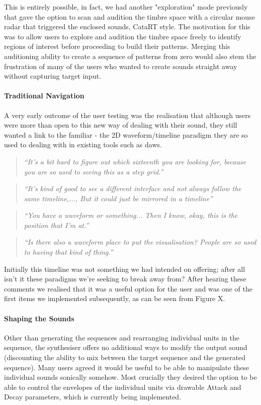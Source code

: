 This is entirely possible, in fact, we had another "exploration" mode previously that gave the option to scan and audition the timbre space with a circular mouse radar that triggered the enclosed sounds, CataRT style. The motivation for this was to allow users to explore and audition the timbre space freely to identify regions of interest before proceeding to build their patterns. Merging this auditioning ability to create a sequence of patterns from zero would  also stem the frustration of many of the users who wanted to create sounds straight away without capturing target input.

\paragraph{Traditional Navigation}

A very early outcome of the user testing was the realisation that although users were more than open to this new way of dealing with their sound, they still wanted a link to the familiar - the  2D waveform/timeline paradigm they are so used to dealing with in existing tools such as \acrshort{daw}s.

\blockquote{\textit{“It's a bit hard to figure out which sixteenth you are looking for, because you are so used to seeing this as a step grid.”}}

\blockquote{\textit{“It's kind of good to see a different interface and not always follow the same timeline,..., But it could just be mirrored in a timeline”}}

\blockquote{\textit{“You have a waveform or something...  Then I know, okay, this is the position that I'm at.”}}

\blockquote{\textit{“Is there also a  waveform place to put the visualisation? People are so used to having that kind of thing.”}}

Initially this timeline was not something we had intended on offering; after all isn't it these paradigms we're seeking to break away from? After hearing these comments we realised that it was a useful option for the user and was one of the first items we implemented subsequently, as can be seen from Figure X.

\paragraph{Shaping the Sounds}

Other than generating the sequences and rearranging individual units in the sequence, the synthesiser offers no additional ways to modify the output sound (discounting the ability to mix between the target sequence and the generated sequence). Many users agreed it would be useful to be able to manipulate these individual sounds sonically somehow. Most crucially they desired the option to be able to control the envelopes of the individual units via drawable Attack and Decay parameters, which is currently being implemented.
  
